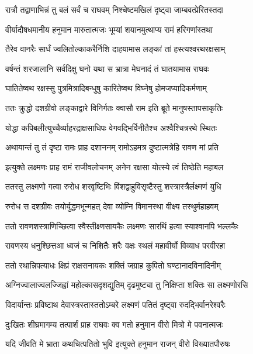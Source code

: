 \twolineshloka
{रात्रौ तद्वाणाभिन्नं तु बलं सर्वं च राघवम्}
{निश्चेष्टमखिलं दृष्ट्वा जाम्बवत्प्रेरितस्तदा} %

\twolineshloka
{वीर्यादौषधमानीय हनुमान मारुतात्मजः}
{भूम्यां शयानमुत्थाप्य रामं हरिगणांस्तथा} %

\twolineshloka
{तैरेव वानरैः सार्धं ज्वलितोल्काकरैर्निशि}
{दाहयामास लङ्कां तां हस्त्यश्वरथरक्षसाम्} %

\twolineshloka
{वर्षन्तं शरजालानि सर्वदिक्षु घनो यथा}
{स भ्रात्रा मेघनादं तं घातयामास राघवः} %

\twolineshloka
{घातितेष्वथ रक्षस्सु पुत्रमित्रादिबन्धुषु}
{कारितेष्वथ विघ्नेषु होमजप्यादिकर्मणाम्} %

\twolineshloka
{ततः क्रुद्धो दशग्रीवो लङ्काद्वारे विनिर्गतः}
{क्वासौ राम इति ब्रूते मानुषस्तापसाकृतिः} %

\twolineshloka
{योद्धा कपिबलीत्युच्चैर्व्याहरद्राक्षसाधिपः}
{वेगवद्भिर्विनीतैश्च अश्वैश्चित्ररथे स्थितः} %

\twolineshloka
{अथायान्तं तु तं दृष्टा रामः प्राह दशाननम्}
{रामोऽहमत्र दुष्टात्मत्रेहि रावण मां प्रति} %

\twolineshloka
{इत्युक्ते लक्ष्मणः प्राह रामं राजीवलोचनम्}
{अनेन रक्षसा योत्स्ये त्वं तिष्ठेति महाबल} %

\twolineshloka
{ततस्तु लक्ष्मणो गत्वा रुरोध शरवृष्टिभिः}
{विंशद्वाहुविसृष्टैस्तु शस्त्रास्त्रैर्लक्ष्मणं युधि} %

\twolineshloka
{रुरोध स दशग्रीवः तयोर्युद्धमभून्महत्}
{देवा व्योम्नि विमानस्था वीक्ष्य तस्थुर्महाहवम्} %

\twolineshloka
{ततो रावणशस्त्राणिच्छित्वा स्वैस्तीक्ष्णसायकैः}
{लक्ष्मणः सारथिं हत्वा स्याश्वानपि भल्लकैः} %

\twolineshloka
{रावणस्य धनुश्छित्तआ ध्वजं च निशितैः शरैः}
{वक्षः स्थलं महावीर्यो विव्याध परवीरहा} %

\twolineshloka
{ततो रथान्निपत्याधः क्षिप्रं राक्षसनायकः}
{शक्तिं जग्राह कुपितो घण्टानादविनादिनीम्} %

\twolineshloka
{अग्निज्वालाज्वलज्जिह्वां महोल्कासदृशद्युतिम्}
{दृढमुष्ट्या तु निक्षिप्ता शक्तिः सा लक्ष्मणोरसि} %

\twolineshloka
{विदार्यान्तः प्रविष्टाथ देवास्त्रस्तास्ततोऽम्बरे}
{लक्ष्मणं पतितं दृष्ट्वा रुदद्भिर्वानरेश्वरैः} %

\twolineshloka
{दुःखितः शीघ्रमागम्य तत्पार्शं प्राह राघवः}
{क्व गतो हनुमान वीरो मित्रो मे पवनात्मजः} %

\twolineshloka
{यदि जीवति मे भ्राता कथचित्पतितो भुवि}
{इत्युक्ते हनुमान राजन् वीरो विख्यातपौरुषः} %

